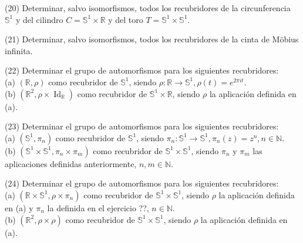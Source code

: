 \documentclass[
  a4paper,
  spanish,
  12pt,
]{scrartcl}
\begin{document}
\begin{ejer}
(20) Determinar, salvo isomorfismos, todos los recubridores de la circunferencia $\mathbb{S}^{1}$ y del cilindro $C=\mathbb{S}^{1} \times \mathbb{R}$ y del toro $T=\mathbb{S}^{1} \times \mathbb{S}^{1}$.\\
\end{ejer}

\begin{ejer}
(21) Determinar, salvo isomorfismos, todos los recubridores de la cinta de Möbius infinita.\\
\end{ejer}

\begin{ejer}
(22) Determinar el grupo de automorfismos para los siguientes recubridores:\\
(a) $(\mathbb{R}, \rho)$ como recubridor de $\mathbb{S}^{1}$, siendo $\rho: \mathbb{R} \rightarrow \mathbb{S}^{1}, \rho(t)=e^{2 \pi i t}$.\\
(b) $\left(\mathbb{R}^{2}, \rho \times \operatorname{Id}_{\mathbb{R}}\right)$ como recubridor de $\mathbb{S}^{1} \times \mathbb{R}$, siendo $\rho$ la aplicación definida en (a).\\
\end{ejer}

\begin{ejer}
(23) Determinar el grupo de automorfismos para los siguientes recubridores:\\
(a) $\left(\mathbb{S}^{1}, \pi_{n}\right)$ como recubridor de $\mathbb{S}^{1}$, siendo $\pi_{n}: \mathbb{S}^{1} \rightarrow \mathbb{S}^{1}, \pi_{n}(z)=z^{n}, n \in \mathbb{N}$.\\
(b) $\left(\mathbb{S}^{1} \times \mathbb{S}^{1}, \pi_{n} \times \pi_{m}\right)$ como recubridor de $\mathbb{S}^{1} \times \mathbb{S}^{1}$, siendo $\pi_{n}$ y $\pi_{m}$ las aplicaciones definidas anteriormente, $n, m \in \mathbb{N}$.\\
\end{ejer}

\begin{ejer}
(24) Determinar el grupo de automorfismos para los siguientes recubridores:\\
(a) $\left(\mathbb{R} \times \mathbb{S}^{1}, \rho \times \pi_{n}\right)$ como recubridor de $\mathbb{S}^{1} \times \mathbb{S}^{1}$, siendo $\rho$ la aplicación definida en (a) y $\pi_{n}$ la definida en el ejercicio ??, $n \in \mathbb{N}$.\\
(b) $\left(\mathbb{R}^{2}, \rho \times \rho\right)$ como recubridor de $\mathbb{S}^{1} \times \mathbb{S}^{1}$, siendo $\rho$ la aplicación definida en (a).\\
\end{ejer}
\end{document}

